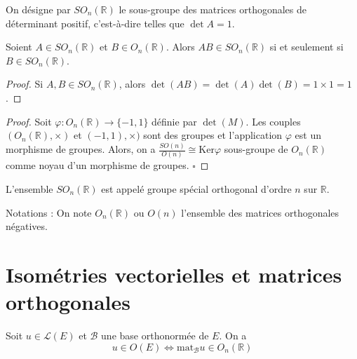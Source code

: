 \begin{definition}
\label{def:9}

On désigne par $SO_n(\mathbb{R})$ le sous-groupe des matrices orthogonales de déterminant positif, c'est-à-dire telles que $\det A = 1$.

\end{definition}

\begin{proposition}
\label{prop:18}

Soient $A \in SO_n(\mathbb{R})$ et $B \in O_n(\mathbb{R})$. Alors $AB \in SO_n(\mathbb{R})$ si et seulement si $B \in SO_n(\mathbb{R})$.

\end{proposition}

\begin{proof}

Si $A, B \in SO_n(\mathbb{R})$, alors $\det(AB) = \det(A) \det(B) = 1 \times 1 = 1$.

\end{proof}

\begin{proof}

Soit $\varphi : O_n(\mathbb{R}) \to \{-1, 1\}$ définie par $\det(M)$. Les couples $(O_n(\mathbb{R}), \times)$ et $(-1, 1), \times)$ sont des groupes et l'application $\varphi$ est un morphisme de groupes. Alors, on a $\frac{SO(n)}{O(n)} \cong \text{Ker} \varphi$ sous-groupe de $O_n(\mathbb{R})$ comme noyau d'un morphisme de groupes. \hfill $\square$

\end{proof}

\begin{definition}
\label{def:10}

L'ensemble $SO_n(\mathbb{R})$ est appelé groupe spécial orthogonal d'ordre $n$ sur $\mathbb{R}$.

Notations : On note $O_n(\mathbb{R})$ ou $O(n)$ l'ensemble des matrices orthogonales négatives.

\end{definition}

\section{Isométries vectorielles et matrices orthogonales}

\begin{theorem}
\label{thm:5}

Soit $u \in \mathcal{L}(E)$ et $\mathcal{B}$ une base orthonormée de $E$. On a
\[ u \in O(E) \iff \text{mat}_{\mathcal{B}} u \in O_n(\mathbb{R}) \]

\end{theorem}


